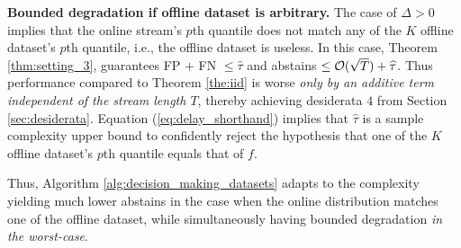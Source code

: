 \textbf{Bounded degradation if offline dataset is arbitrary.} The case of $\Delta > 0$  implies that the online stream's $p$th quantile does not match any of the $K$ offline dataset's $p$th quantile, i.e., the offline dataset is useless. In this case, Theorem \ref{thm:setting_3}, guarantees FP $+$ FN $\leq \widehat{\tau}$ and abstains $\leq {\mathcal{O}}(\sqrt{T}) + \widehat{\tau}$. Thus performance compared to Theorem \ref{the:iid} is worse \emph{only by an additive term independent of the stream length $T$}, thereby achieving desiderata $4$ from Section \ref{sec:desiderata}.
 Equation (\ref{eq:delay_shorthand}) implies that $\widehat{\tau}$ is a {sample complexity upper bound} to confidently reject the hypothesis that one of the $K$ offline dataset's  $p$th quantile equals that of $f$.%

  Thus, Algorithm \ref{alg:decision_making_datasets} adapts to the complexity yielding much lower abstains in the case when the online distribution matches one of the offline dataset, while simultaneously having bounded degradation \emph{in the worst-case}. 





